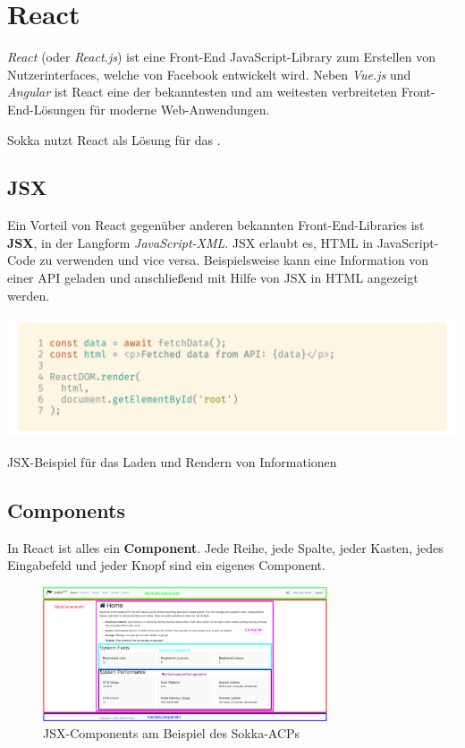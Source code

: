 \section{React}

\textit{React} (oder \textit{React.js}) ist eine Front-End JavaScript-Library zum Erstellen von Nutzerinterfaces, welche von Facebook entwickelt wird. Neben \textit{Vue.js} und \textit{Angular} ist React eine der bekanntesten und am weitesten verbreiteten Front-End-Lösungen für moderne Web-Anwendungen. \cite{nadafkhanrathod2020}

Sokka nutzt React als Lösung für das .

\subsection{JSX}

Ein Vorteil von React gegenüber anderen bekannten Front-End-Libraries ist \textbf{JSX}, in der Langform \textit{JavaScript-XML}. JSX erlaubt es, HTML in JavaScript-Code zu verwenden und vice versa. Beispielsweise kann eine Information von einer API geladen und anschließend mit Hilfe von JSX in HTML angezeigt werden.

\begin{code}[h]
    \centering
    \includegraphics[width=1\textwidth]{images/React/jsx.png}
    \caption{JSX-Beispiel für das Laden und Rendern von Informationen}
\end{code}

\subsection{Components}

In React ist alles ein \textbf{Component}. Jede Reihe, jede Spalte, jeder Kasten, jedes Eingabefeld und jeder Knopf sind ein eigenes Component.

\begin{figure}[h]
    \begin{center}
        \includegraphics[width=0.75\textwidth]{images/React/components.png}
        \caption{JSX-Components am Beispiel des Sokka-ACPs}
    \end{center}
\end{figure}

